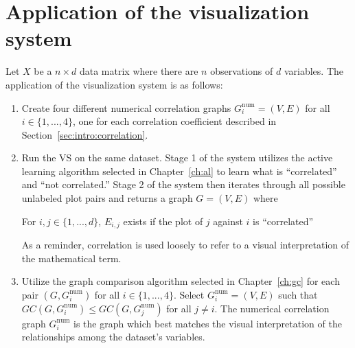 \section{Application of the visualization system}
\label{sec:usage:newanalysis}

Let $X$ be a $n\times d$ data matrix where there are $n$ observations of $d$ 
variables. The application of the visualization system is as follows:

\tablespacing
\begin{enumerate}
	\item Create four different numerical correlation graphs 
	$G_i^{\text{num}}=(V,E)$ for all $i\in \{1,...,4\}$, one for each 
	correlation coefficient described in Section~\ref{sec:intro:correlation}.
	\item Run the VS on the same dataset. Stage 1 of the system utilizes the 
	active learning algorithm selected in Chapter~\ref{ch:al} to learn what is 
	``correlated'' and ``not correlated.'' Stage 2 of the system then iterates 
	through all possible unlabeled plot pairs and returns a graph $G=(V,E)$ 
	where 

\begin{algorithm}
	For $i,j\in \{1,...,d\}$, $E_{i,j}$ exists if the plot of $j$ against $i$ 
	is ``correlated''
\end{algorithm}

	As a reminder, correlation is used loosely to refer to a visual 
	interpretation of the mathematical term.

	\item Utilize the graph comparison algorithm selected in 
	Chapter~\ref{ch:gc} for each pair $(G,G_i^{\text{num}})$ for all $i \in 
	\{1,...,4\}$. 
	Select $G_i^{\text{num}}=(V,E)$ such that $GC(G,G_i^{\text{num}}) \leq 
	GC(G,G_j^{\text{num}})$ 
	for all $j\neq i$. The 
	numerical correlation graph $G_i^{\text{num}}$ is the graph which 
	best 
	matches the visual interpretation of the relationships among the dataset's 
	variables.
\end{enumerate}
\bodyspacing